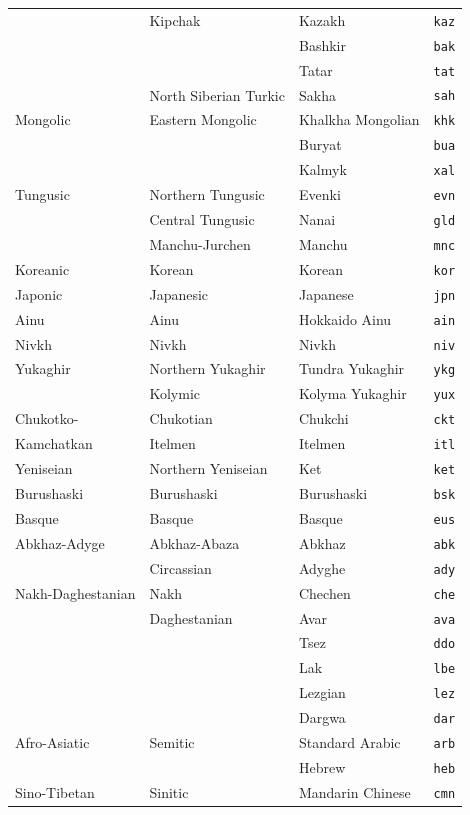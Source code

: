 \begin{center}
\begin{longtable}{llll}
&Kipchak&Kazakh&\texttt{kaz}\\
&&Bashkir&\texttt{bak}\\
&&Tatar&\texttt{tat}\\
&North Siberian Turkic&Sakha&\texttt{sah}\\
\hline
Mongolic&Eastern Mongolic&Khalkha Mongolian&\texttt{khk}\\
&&Buryat&\texttt{bua}\\
&&Kalmyk&\texttt{xal}\\
\hline
Tungusic&Northern Tungusic&Evenki&\texttt{evn}\\
&Central Tungusic&Nanai&\texttt{gld}\\
&Manchu-Jurchen&Manchu&\texttt{mnc}\\
\hline
Koreanic&Korean&Korean&\texttt{kor}\\
\hline
Japonic&Japanesic&Japanese&\texttt{jpn}\\
\hline
Ainu&Ainu&Hokkaido Ainu&\texttt{ain}\\
\hline
Nivkh&Nivkh&Nivkh&\texttt{niv}\\
\hline
Yukaghir&Northern Yukaghir&Tundra Yukaghir&\texttt{ykg}\\
&Kolymic&Kolyma Yukaghir&\texttt{yux}\\
\hline
Chukotko-&Chukotian&Chukchi&\texttt{ckt}\\
Kamchatkan&Itelmen&Itelmen&\texttt{itl}\\
\hline
Yeniseian&Northern Yeniseian&Ket&\texttt{ket}\\
\hline
Burushaski&Burushaski&Burushaski&\texttt{bsk}\\
\hline
Basque&Basque&Basque&\texttt{eus}\\
\hline
Abkhaz-Adyge&Abkhaz-Abaza&Abkhaz&\texttt{abk}\\
&Circassian&Adyghe&\texttt{ady}\\
\hline
Nakh-Daghestanian&Nakh&Chechen&\texttt{che}\\
&Daghestanian&Avar&\texttt{ava}\\
&&Tsez&\texttt{ddo}\\
&&Lak&\texttt{lbe}\\
&&Lezgian&\texttt{lez}\\
&&Dargwa&\texttt{dar}\\
\hline
Afro-Asiatic&Semitic&Standard Arabic&\texttt{arb}\\
&&Hebrew&\texttt{heb}\\
\hline
Sino-Tibetan&Sinitic&Mandarin Chinese&\texttt{cmn}\\
\hline
\end{longtable}
 \addtocounter{table}{-1}
\end{center}

